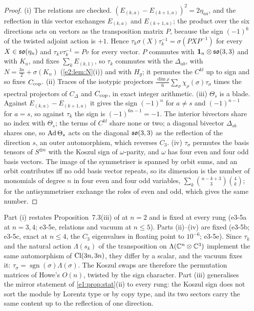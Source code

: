 \begin{proof}
(i) The relations are checked. $(E_{(k,a)}-E_{(k+1,a)})^2=2\eta_{aa}$, and the reflection in this vector exchanges $E_{(k,a)}$ and $E_{(k+1,a)}$; the product
over the six directions acts on vectors as the transposition matrix $P$, because the sign $(-1)^6$ of the twisted adjoint action is $+1$. Hence
$\tau_k\sigma(X)\tau_k^{-1}=\sigma(PXP^{-1})$ for every $X\in\mathfrak{so}(\eta_n)$ and $\tau_kv\tau_k^{-1}=Pv$ for every vector. $P$ commutes with $\mathbf 1_n\otimes\mathfrak{so}(3,3)$ and with
$K_n$, and fixes $\sum_kE_{(k,1)}$, so $\tau_k$ commutes with the $\Delta_{ab}$, with $N=\tfrac{3n}2+\sigma(K_n)$ (\cref{e2:lem:N}(i)) and with $H_g$; it permutes
the $C^{kl}$ up to sign and so fixes $C_{\rm cop}$. (ii) Traces of the isotypic projectors
$\frac{\dim\rho}{6}\sum_\sigma\chi_\rho(\sigma)\tau_\sigma$ times the spectral projectors of $C_\Delta$ and $C_{\rm cop}$, in exact integer arithmetic. (iii) $\Theta_s$ is a
blade. Against $E_{(k,a)}-E_{(k+1,a)}$ it gives the sign $(-1)^n$ for $a\ne s$ and $(-1)^{n-1}$ for $a=s$, so against $\tau_k$ the sign is $(-1)^{6n-1}=-1$.
The interior bivectors share no index with $\Theta_s$; the terms of $C^{kl}$ share none or two; a diagonal bivector $\Delta_{sb}$ shares one, so
$\operatorname{Ad}\Theta_s$ acts on the diagonal $\mathfrak{so}(3,3)$ as the reflection of the direction $s$, an outer automorphism, which reverses $C_3$. (iv) $\tau_\sigma$
permutes the basis tensors of $S^{\otimes n}$ with the Koszul sign of $\omega$-parity, and $\omega$ has four even and four odd basis vectors. The image of
the symmetriser is spanned by orbit sums, and an orbit contributes iff no odd basis vector repeats, so its dimension is the number of
monomials of degree $n$ in four even and four odd variables, $\sum_k\binom{n-k+3}3\binom4k$; for the antisymmetriser exchange the roles of even
and odd, which gives the same number.
\end{proof}

Part (i) restates Proposition~7.3(iii) of \cite{RE} at $n=2$ and is fixed at every rung (e3-5a at $n=3,4$; e3-5e, relations and vacuum at
$n\le5$). Parts (ii)--(iv) are fixed (e3-5b; e3-5c, exact at $n\le4$, the $C_3$ eigenvalues in floating point to $10^{-6}$; e3-5e). Since $\tau_k$
and the natural action $\Lambda(s_k)$ of the transposition on $\Lambda(\mathbb{C}^n\otimes\mathbb{C}^3)$ implement the same automorphism of $\mathrm{Cl}(3n,3n)$, they differ by
a scalar, and the vacuum fixes it: $\tau_\sigma=\operatorname{sgn}(\sigma)\Lambda(\sigma)$. The Koszul swaps are therefore the permutation matrices of
Howe's $O(n)$, twisted by the sign character. Part (iii) generalises the mirror statement of \cref{e1:prop:stat}(ii) to every rung: the
Koszul sign does not sort the module by Lorentz type or by copy type, and its two sectors carry the same content up to the reflection of
one direction.

